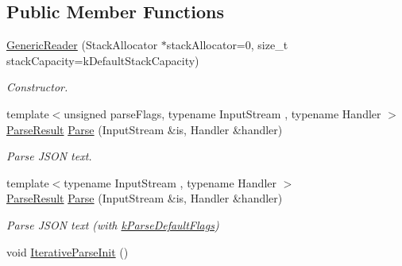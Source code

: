 \subsection*{Public Member Functions}
\begin{DoxyCompactItemize}
\item 
\hyperlink{a00122_aab875a34b3092df9fb4e2b8eac6dbb96}{Generic\+Reader} (Stack\+Allocator $\ast$stack\+Allocator=0, size\+\_\+t stack\+Capacity=k\+Default\+Stack\+Capacity)
\begin{DoxyCompactList}\small\item\em Constructor. \end{DoxyCompactList}\item 
{\footnotesize template$<$unsigned parse\+Flags, typename Input\+Stream , typename Handler $>$ }\\\hyperlink{a00230}{Parse\+Result} \hyperlink{a00122_a0c450620d14ff1824e58bb7bd9b42099}{Parse} (Input\+Stream \&is, Handler \&handler)
\begin{DoxyCompactList}\small\item\em Parse J\+S\+ON text. \end{DoxyCompactList}\item 
{\footnotesize template$<$typename Input\+Stream , typename Handler $>$ }\\\hyperlink{a00230}{Parse\+Result} \hyperlink{a00122_a76d91e5fd8dfe48aea7dd6d8a51dd6dc}{Parse} (Input\+Stream \&is, Handler \&handler)
\begin{DoxyCompactList}\small\item\em Parse J\+S\+ON text (with \hyperlink{a00683_ab7be7dabe6ffcba60fad441505583450a9104b0946d648e9467cb7a967401ec80}{k\+Parse\+Default\+Flags}) \end{DoxyCompactList}\item 
void \hyperlink{a00122_a7de472eda2ad9de13cfd8c1de74f1754}{Iterative\+Parse\+Init} ()\hypertarget{a00122_a7de472eda2ad9de13cfd8c1de74f1754}{}\label{a00122_a7de472eda2ad9de13cfd8c1de74f1754}


\end{DoxyCompactItemize}
